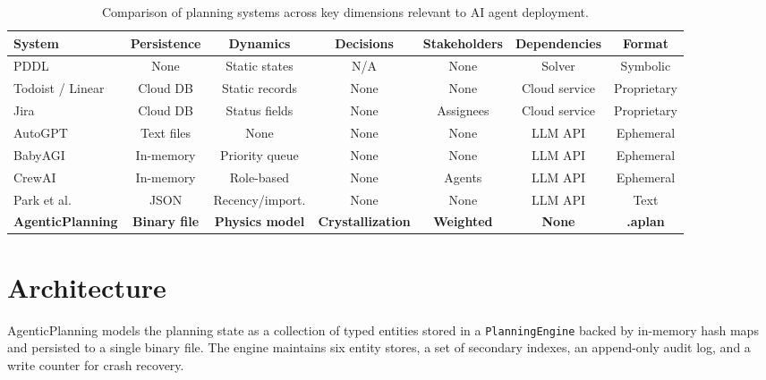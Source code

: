 \documentclass[10pt, twocolumn]{article}
\begin{document}
\begin{table}[t]
\caption{Comparison of planning systems across key dimensions relevant to AI agent deployment.}
\label{tab:related}
\centering
\small
\begin{tabular}{@{}lcccccc@{}}
\toprule
\textbf{System} & \textbf{Persistence} & \textbf{Dynamics} & \textbf{Decisions} & \textbf{Stakeholders} & \textbf{Dependencies} & \textbf{Format} \\
\midrule
PDDL~\cite{mcdermott1998pddl} & None & Static states & N/A & None & Solver & Symbolic \\
Todoist / Linear & Cloud DB & Static records & None & None & Cloud service & Proprietary \\
Jira~\cite{jira_2024} & Cloud DB & Status fields & None & Assignees & Cloud service & Proprietary \\
AutoGPT~\cite{autogpt_2024} & Text files & None & None & None & LLM API & Ephemeral \\
BabyAGI~\cite{babyagi_2024} & In-memory & Priority queue & None & None & LLM API & Ephemeral \\
CrewAI~\cite{crewai_2024} & In-memory & Role-based & None & Agents & LLM API & Ephemeral \\
Park et al.~\cite{park2023generative} & JSON & Recency/import. & None & None & LLM API & Text \\
\midrule
\textbf{AgenticPlanning} & \textbf{Binary file} & \textbf{Physics model} & \textbf{Crystallization} & \textbf{Weighted} & \textbf{None} & \textbf{.aplan} \\
\bottomrule
\end{tabular}
\end{table}


\section{Architecture}
\label{sec:architecture}

AgenticPlanning models the planning state as a collection of typed entities stored in a \texttt{PlanningEngine} backed by in-memory hash maps and persisted to a single binary file. The engine maintains six entity stores, a set of secondary indexes, an append-only audit log, and a write counter for crash recovery.

\end{document}
